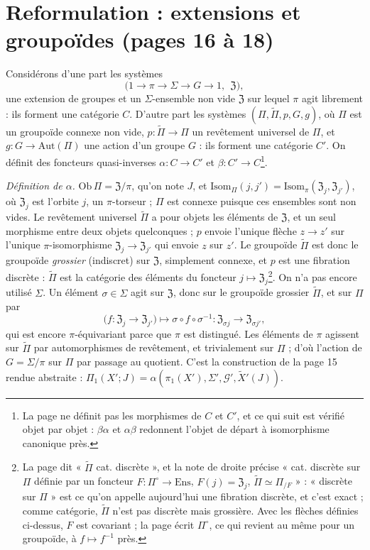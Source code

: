 \documentclass[11pt,a4paper]{article}
\begin{document}
\section*{Reformulation : extensions et groupoïdes (pages 16 à 18)}

Considérons d'une part les systèmes
\[
\bigl(1 \to \pi \to \Sigma \to G \to 1,\ \ \mathfrak{Z}\bigr),
\]
une extension de groupes et un $\Sigma$-ensemble non vide $\mathfrak{Z}$ sur
lequel $\pi$ agit librement : ils forment une catégorie $C$. D'autre part les
systèmes $(\Pi, \widetilde\Pi, p, G, g)$, où $\Pi$ est un groupoïde connexe non
vide, $p : \widetilde\Pi \to \Pi$ un revêtement universel de $\Pi$, et $g : G
\to \mathrm{Aut}(\Pi)$ une action d'un groupe $G$ : ils forment une catégorie
$C'$. On définit des foncteurs quasi-inverses $\alpha : C \to C'$ et $\beta :
C' \to C$\footnote{La page ne définit pas les morphismes de $C$ et $C'$, et ce
qui suit est vérifié objet par objet : $\beta\alpha$ et $\alpha\beta$ redonnent
l'objet de départ à isomorphisme canonique près.}.

\emph{Définition de $\alpha$.} $\mathrm{Ob}\,\Pi = \mathfrak{Z}/\pi$, qu'on
note $J$, et $\mathrm{Isom}_\Pi(j, j') = \mathrm{Isom}_\pi(\mathfrak{Z}_j,
\mathfrak{Z}_{j'})$, où $\mathfrak{Z}_j$ est l'orbite $j$, un $\pi$-torseur ;
$\Pi$ est connexe puisque ces ensembles sont non vides. Le revêtement universel
$\widetilde\Pi$ a pour objets les éléments de $\mathfrak{Z}$, et un seul
morphisme entre deux objets quelconques ; $p$ envoie l'unique flèche $z \to
z'$ sur l'unique $\pi$-isomorphisme $\mathfrak{Z}_j \to \mathfrak{Z}_{j'}$ qui
envoie $z$ sur $z'$. Le groupoïde $\widetilde\Pi$ est donc le groupoïde
\emph{grossier} (indiscret) sur $\mathfrak{Z}$, simplement connexe, et $p$ est
une fibration discrète : $\widetilde\Pi$ est la catégorie des éléments du
foncteur $j \mapsto \mathfrak{Z}_j$\footnote{La page dit « $\widetilde\Pi$ cat.
discrète », et la note de droite précise « cat. discrète sur $\Pi$ définie par
un foncteur $F : \Pi^{\circ} \to \mathrm{Ens}$, $F(j) = \mathfrak{Z}_j$,
$\widetilde\Pi \simeq \Pi_{/F}$ » : « discrète sur $\Pi$ » est ce qu'on appelle
aujourd'hui une fibration discrète, et c'est exact ; comme catégorie,
$\widetilde\Pi$ n'est pas discrète mais grossière. Avec les flèches définies
ci-dessus, $F$ est covariant ; la page écrit $\Pi^{\circ}$, ce qui revient au
même pour un groupoïde, à $f \mapsto f^{-1}$ près.}. On n'a pas encore utilisé
$\Sigma$. Un élément $\sigma \in \Sigma$ agit sur $\mathfrak{Z}$, donc sur le
groupoïde grossier $\widetilde\Pi$, et sur $\Pi$ par
\[
\bigl(f : \mathfrak{Z}_j \to \mathfrak{Z}_{j'}\bigr) \longmapsto \sigma
\circ f \circ \sigma^{-1} : \mathfrak{Z}_{\sigma j} \to \mathfrak{Z}_{\sigma j'},
\]
qui est encore $\pi$-équivariant parce que $\pi$ est distingué. Les éléments de
$\pi$ agissent sur $\widetilde\Pi$ par automorphismes de revêtement, et
trivialement sur $\Pi$ ; d'où l'action de $G = \Sigma/\pi$ sur $\Pi$ par
passage au quotient. C'est la construction de la page 15 rendue abstraite :
$\Pi_1(X'; J) = \alpha(\pi_1(X'), \Sigma', \mathcal{G}', \widetilde X'(J))$.
\end{document}
